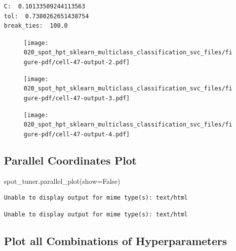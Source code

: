 \documentclass[
  letterpaper,
  DIV=11,
  numbers=noendperiod]{scrreprt}
\newenvironment{Shaded}{\begin{snugshade}}{\end{snugshade}}
\newcommand{\NormalTok}[1]{\textcolor[rgb]{0.00,0.23,0.31}{#1}}
\newcommand{\OperatorTok}[1]{\textcolor[rgb]{0.37,0.37,0.37}{#1}}
\newcommand{\VariableTok}[1]{\textcolor[rgb]{0.07,0.07,0.07}{#1}}
\begin{document}
\begin{verbatim}
C:  0.10133509244113563
tol:  0.7380262651438754
break_ties:  100.0
\end{verbatim}

\begin{figure}[H]

{\centering \texttt{[image: 020\_spot\_hpt\_sklearn\_multiclass\_classification\_svc\_files/figure-pdf/cell-47-output-2.pdf]}

}

\end{figure}

\begin{figure}[H]

{\centering \texttt{[image: 020\_spot\_hpt\_sklearn\_multiclass\_classification\_svc\_files/figure-pdf/cell-47-output-3.pdf]}

}

\end{figure}

\begin{figure}[H]

{\centering \texttt{[image: 020\_spot\_hpt\_sklearn\_multiclass\_classification\_svc\_files/figure-pdf/cell-47-output-4.pdf]}

}

\end{figure}

\hypertarget{parallel-coordinates-plot-3}{%
\subsection{Parallel Coordinates
Plot}\label{parallel-coordinates-plot-3}}

\begin{Shaded}
\begin{Highlighting}[]
\NormalTok{spot\_tuner.parallel\_plot(show}\OperatorTok{=}\VariableTok{False}\NormalTok{)}
\end{Highlighting}
\end{Shaded}

\begin{verbatim}
Unable to display output for mime type(s): text/html
\end{verbatim}

\begin{verbatim}
Unable to display output for mime type(s): text/html
\end{verbatim}

\hypertarget{plot-all-combinations-of-hyperparameters-3}{%
\subsection{Plot all Combinations of
Hyperparameters}\label{plot-all-combinations-of-hyperparameters-3}}
\end{document}
